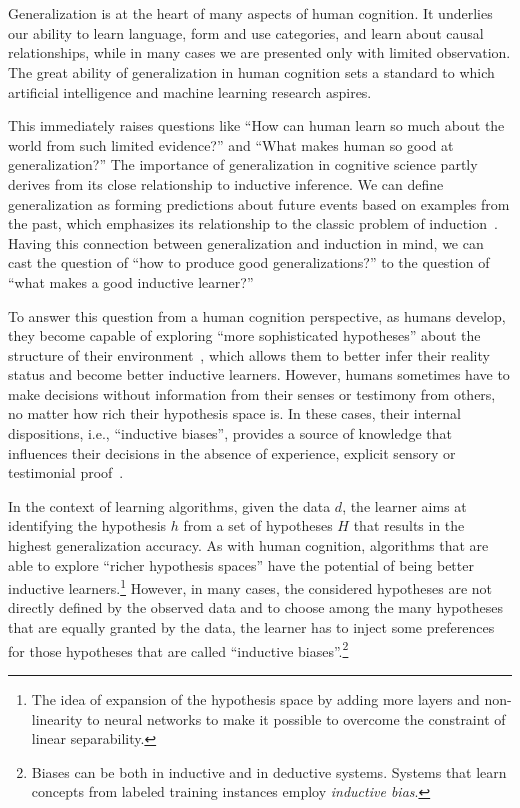 \part{}
\label{part3}
Generalization is at the heart of many aspects of human cognition. It underlies our ability to learn language, form and use categories, and learn about causal relationships, while in many cases we are presented only with limited observation. The great ability of generalization in human cognition sets a standard to which artificial intelligence and machine learning research aspires.

This immediately raises questions like ``How can human learn so much about the world from such limited evidence?'' and ``What makes human so good at generalization?''
The importance of generalization in cognitive science partly derives
from its close relationship to inductive inference.  We can define generalization as forming predictions about future events based on examples from the past, which emphasizes its relationship to the classic problem of induction~\citep{hume2003treatise}. 
Having this connection between generalization and induction in mind, we can cast the question of ``how to produce good generalizations?'' to the question of ``what makes a good inductive learner?''

To answer this question from a human cognition perspective, as humans develop, they become capable of exploring ``more sophisticated hypotheses'' about the structure of their environment~\citep{inhelder1958growth}, which allows them to better infer their reality status and become better inductive learners. However, humans sometimes have to make decisions without information from their senses or testimony from others, no matter how rich their hypothesis space is.
In these cases, their internal dispositions, i.e., ``inductive biases'', provides a source of knowledge that influences their decisions in the absence of experience, explicit sensory or testimonial proof~\cite{sodian1987children,griffiths2010probabilistic}.

In the context of learning algorithms, given the data $d$, the learner aims at identifying the hypothesis $h$ from a set of hypotheses $H$ that results in the highest generalization accuracy. As with human cognition, algorithms that are able to explore ``richer hypothesis spaces'' have the potential of being better inductive learners.\footnote{The idea of expansion of the hypothesis space by adding more layers and non-linearity to neural networks to make it possible to overcome the constraint of linear separability.} However, in many cases, the considered hypotheses are not directly defined by the observed data and to choose among the many hypotheses that are equally granted by the data, the learner has to inject some preferences for those hypotheses that are called ``inductive biases''.\footnote{Biases can be both in inductive and in deductive systems. Systems that learn concepts from labeled training instances employ \emph{inductive bias}.}

